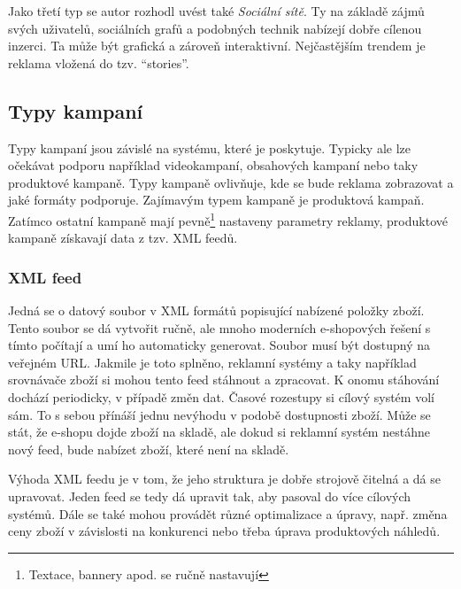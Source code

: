 Jako třetí typ se autor rozhodl uvést také \emph{Sociální sítě}. Ty na základě zájmů svých uživatelů, sociálních grafů a podobných technik nabízejí dobře cílenou inzerci.
Ta může být grafická a zároveň interaktivní. Nejčastějším trendem je reklama vložená do tzv. \enquote{stories}.

\subsection{Typy kampaní}
Typy kampaní jsou závislé na systému, které je poskytuje. Typicky ale lze očekávat podporu například videokampaní, obsahových kampaní nebo taky produktové kampaně.
Typy kampaně ovlivňuje, kde se bude reklama zobrazovat a jaké formáty podporuje. Zajímavým typem kampaně je produktová kampaň. Zatímco ostatní kampaně mají
pevně\footnote{Textace, bannery apod. se ručně nastavují} nastaveny parametry reklamy, produktové kampaně získavají data z tzv. XML feedů. 

\subsubsection{XML feed}
Jedná se o datový soubor v XML formátů popisující nabízené položky zboží. Tento soubor se dá vytvořit ručně, ale mnoho moderních e-shopových řešení
s tímto počítají a umí ho automaticky generovat. Soubor musí být dostupný na veřejném URL. Jakmile je toto splněno, reklamní systémy a taky například
srovnávače zboží si mohou tento feed stáhnout a zpracovat. K onomu stáhování dochází periodicky, v případě změn dat. Časové rozestupy si cílový systém
volí sám. To s sebou přínáší jednu nevýhodu v podobě dostupnosti zboží. Může se stát, že e-shopu dojde zboží na skladě, ale dokud si reklamní systém
nestáhne nový feed, bude nabízet zboží, které není na skladě.

Výhoda XML feedu je v tom, že jeho struktura je dobře strojově čitelná a dá se upravovat. Jeden feed se tedy dá upravit tak, aby pasoval do více
cílových systémů. Dále se také mohou provádět různé optimalizace a úpravy, např. změna ceny zboží v závislosti na konkurenci nebo třeba úprava produktových náhledů.

